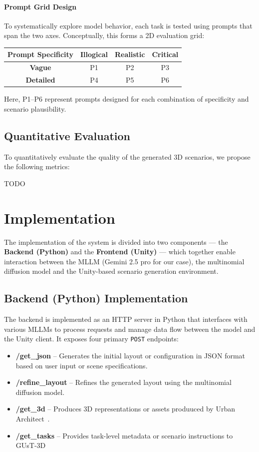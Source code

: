 \documentclass{article}
\begin{document}
\paragraph{Prompt Grid Design}  
To systematically explore model behavior, each task is tested using prompts that span the two axes. Conceptually, this forms a 2D evaluation grid:

\begin{center}
\begin{tabular}{c|c|c|c}
\textbf{Prompt Specificity} & \textbf{Illogical} & \textbf{Realistic} & \textbf{Critical} \\ \hline
\textbf{Vague} & P1 & P2 & P3 \\
\textbf{Detailed} & P4 & P5 & P6
\end{tabular}
\end{center}

Here, P1--P6 represent prompts designed for each combination of specificity and scenario plausibility.

\subsection{Quantitative Evaluation}

To quantitatively evaluate the quality of the generated 3D scenarios, we propose the following metrics:

TODO

\section{Implementation}

The implementation of the system is divided into two components — the \textbf{Backend (Python)} and the \textbf{Frontend (Unity)} — which together enable interaction between the MLLM (Gemini 2.5 pro for our case), the multinomial diffusion model and the Unity-based scenario generation environment.

\subsection{Backend (Python) Implementation}

The backend is implemented as an HTTP server in Python that interfaces with various MLLMs to process requests and manage data flow between the model and the Unity client. 
It exposes four primary \texttt{POST} endpoints:

\begin{itemize}
    \item \textbf{/get\_json} – Generates the initial layout or configuration in JSON format based on user input or scene specifications.
    \item \textbf{/refine\_layout} – Refines the generated layout using the multinomial diffusion model.
    \item \textbf{/get\_3d} – Produces 3D representations or assets produuced by Urban Architect~\cite{lu2024urban}.
    \item \textbf{/get\_tasks} – Provides task-level metadata or scenario instructions to GUsT-3D
\end{itemize}
\end{document}
